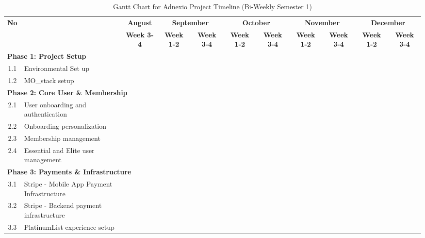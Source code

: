 \begin{table}[htbp]
\centering
\caption{Gantt Chart for Adnexio Project Timeline (Bi-Weekly Semester 1)}
\label{tab:schedule-sem1}
\footnotesize
\setlength{\tabcolsep}{3pt}
\renewcommand{\arraystretch}{1.4}
\begin{adjustbox}{max width=\textwidth}
\begin{tabular}{|c|>{\raggedright\arraybackslash}p{3.2cm}|c|c|c|c|c|c|c|c|c|}
\hline
\multirow{2}{*}{\textbf{No}} & \multirow{2}{*}{\textbf{Epics}}
  & \textbf{August}
  & \multicolumn{2}{c|}{\textbf{September}}
  & \multicolumn{2}{c|}{\textbf{October}}
  & \multicolumn{2}{c|}{\textbf{November}}
  & \multicolumn{2}{c|}{\textbf{December}} \\
\cline{3-11}
 & & \textbf{Week 3-4} & \textbf{Week 1-2} & \textbf{Week 3-4} & \textbf{Week 1-2} & \textbf{Week 3-4} & \textbf{Week 1-2} & \textbf{Week 3-4} & \textbf{Week 1-2} & \textbf{Week 3-4} \\
\hline
\multicolumn{11}{|l|}{\cellcolor{phasebg}\textbf{Phase 1: Project Setup}} \\
\hline
1.1 & Environmental Set up & \cellcolor{ganttfill} & \cellcolor{ganttfill} & & & & & & & \\
\hline
1.2 & MO\_stack setup & & & \cellcolor{ganttfill} & \cellcolor{ganttfill} & & & & & \\
\hline
\multicolumn{11}{|l|}{\cellcolor{phasebg}\textbf{Phase 2: Core User \& Membership}} \\
\hline
2.1 & User onboarding and authentication & & & & \cellcolor{ganttfill} & \cellcolor{ganttfill} & & & & \\
\hline
2.2 & Onboarding personalization & & & & \cellcolor{ganttfill} & \cellcolor{ganttfill} & & & & \\
\hline
2.3 & Membership management & & & & & \cellcolor{ganttfill} & \cellcolor{ganttfill} & & & \\
\hline
2.4 & Essential and Elite user management & & & & & & \cellcolor{ganttfill} & \cellcolor{ganttfill} & \cellcolor{ganttfill} & \\
\hline
\multicolumn{11}{|l|}{\cellcolor{phasebg}\textbf{Phase 3: Payments \& Infrastructure}} \\
\hline
3.1 & Stripe - Mobile App Payment Infrastructure & & & & & & & \cellcolor{ganttfill} & \cellcolor{ganttfill} & \\
\hline
3.2 & Stripe - Backend payment infrastructure & & & & & & & \cellcolor{ganttfill} & \cellcolor{ganttfill} & \\
\hline
3.3 & PlatinumList experience setup & & & & & & & \cellcolor{ganttfill} & \cellcolor{ganttfill} & \cellcolor{ganttfill} \\
\hline
\end{tabular}
\end{adjustbox}
\end{table}
